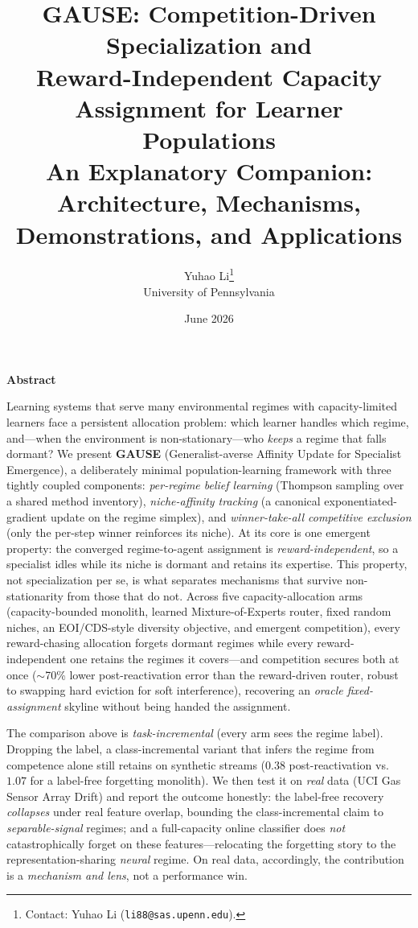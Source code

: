 \documentclass[10pt]{article}
\title{\textbf{GAUSE: Competition-Driven Specialization and\\
Reward-Independent Capacity Assignment for Learner Populations}\\[0.35cm]
\large An Explanatory Companion: Architecture, Mechanisms, Demonstrations,
and Applications}
\author{Yuhao Li\thanks{Contact: Yuhao Li (\texttt{li88@sas.upenn.edu}).}\\
University of Pennsylvania}
\date{June 2026}
\begin{document}
\maketitle
\vspace{-0.45cm}

\begin{abstractbox}
\begin{center}
{\color{headblue}\bfseries Abstract}
\end{center}
\vspace{-0.1cm}
\noindent\small
Learning systems that serve many environmental regimes with capacity-limited
learners face a persistent allocation problem: which learner handles which regime,
and---when the environment is non-stationary---who \emph{keeps} a regime that falls
dormant? We present \textbf{GAUSE} (Generalist-averse Affinity Update for Specialist
Emergence), a deliberately minimal population-learning framework with three tightly
coupled components: \emph{per-regime belief learning} (Thompson sampling over a
shared method inventory), \emph{niche-affinity tracking} (a canonical
exponentiated-gradient update on the regime simplex), and \emph{winner-take-all
competitive exclusion} (only the per-step winner reinforces its niche). At its core
is one emergent property: the converged regime-to-agent assignment is
\emph{reward-independent}, so a specialist idles while its niche is dormant and
retains its expertise. This property, not specialization per se, is what separates
mechanisms that survive non-stationarity from those that do not. Across five
capacity-allocation arms (capacity-bounded monolith, learned Mixture-of-Experts
router, fixed random niches, an EOI/CDS-style diversity objective, and emergent
competition), every reward-chasing allocation forgets dormant regimes while every
reward-independent one retains the regimes it covers---and competition secures both
at once ($\sim$70\% lower post-reactivation error than the reward-driven router,
robust to swapping hard eviction for soft interference), recovering an \emph{oracle
fixed-assignment} skyline without being handed the assignment.

The comparison above is \emph{task-incremental} (every arm sees the regime label).
Dropping the label, a class-incremental variant that infers the regime from
competence alone still retains on synthetic streams ($0.38$ post-reactivation vs.\
$1.07$ for a label-free forgetting monolith). We then test it on \emph{real} data
(UCI Gas Sensor Array Drift) and report the outcome honestly: the label-free recovery
\emph{collapses} under real feature overlap, bounding the class-incremental claim to
\emph{separable-signal} regimes; and a full-capacity online classifier does
\emph{not} catastrophically forget on these features---relocating the forgetting
story to the representation-sharing \emph{neural} regime. On real data, accordingly,
the contribution is a \emph{mechanism and lens}, not a performance win.


\end{abstractbox}
\end{document}
